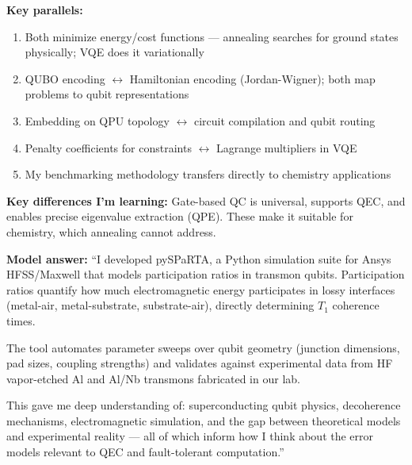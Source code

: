 \documentclass[11pt,a4paper]{article}
\begin{document}
\begin{answerbox}
\textbf{Key parallels:}
\begin{enumerate}
    \item Both minimize energy/cost functions --- annealing searches for ground states physically; VQE does it variationally
    \item QUBO encoding $\leftrightarrow$ Hamiltonian encoding (Jordan-Wigner); both map problems to qubit representations
    \item Embedding on QPU topology $\leftrightarrow$ circuit compilation and qubit routing
    \item Penalty coefficients for constraints $\leftrightarrow$ Lagrange multipliers in VQE
    \item My benchmarking methodology transfers directly to chemistry applications
\end{enumerate}
\textbf{Key differences I'm learning:} Gate-based QC is universal, supports QEC, and enables precise eigenvalue extraction (QPE). These make it suitable for chemistry, which annealing cannot address.
\end{answerbox}

\begin{answerbox}
\textbf{Model answer:} ``I developed pySPaRTA, a Python simulation suite for Ansys HFSS/Maxwell that models participation ratios in transmon qubits. Participation ratios quantify how much electromagnetic energy participates in lossy interfaces (metal-air, metal-substrate, substrate-air), directly determining $T_1$ coherence times.

The tool automates parameter sweeps over qubit geometry (junction dimensions, pad sizes, coupling strengths) and validates against experimental data from HF vapor-etched Al and Al/Nb transmons fabricated in our lab.

This gave me deep understanding of: superconducting qubit physics, decoherence mechanisms, electromagnetic simulation, and the gap between theoretical models and experimental reality --- all of which inform how I think about the error models relevant to QEC and fault-tolerant computation.''
\end{answerbox}
\end{document}
